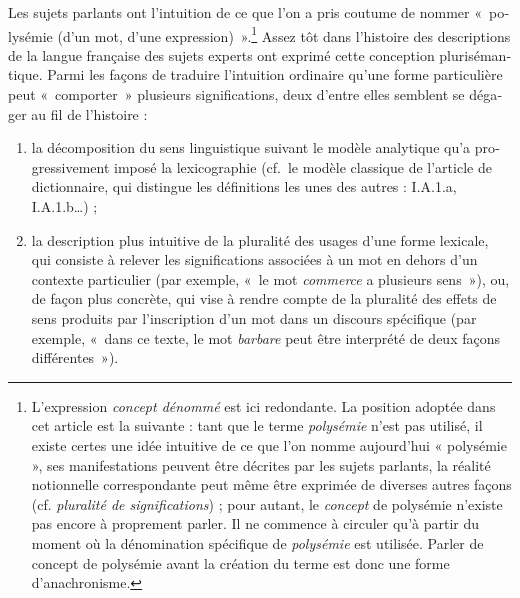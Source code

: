 \documentclass[french,output=paper,colorlinks,citecolor=brown]{../langscibook}
\begin{document}
\begin{otherlanguage}{french}
Les sujets parlants ont l’intuition de ce que l’on a pris coutume de nommer «~polysémie (d’un mot, d’une expression)~».\footnote{L’expression \emph{concept dénommé} est ici redondante. La position adoptée dans cet article est la suivante : tant que le terme \emph{polysémie} n’est pas utilisé, il existe certes une idée intuitive de ce que l’on nomme aujourd’hui « polysémie », ses manifestations peuvent être décrites par les sujets parlants, la réalité notionnelle correspondante peut même être exprimée de diverses autres façons (cf. \emph{pluralité de significations}) ; pour autant, le \emph{concept} de polysémie n’existe pas encore à proprement parler. Il ne commence à circuler qu’à partir du moment où la dénomination spécifique de \emph{polysémie} est utilisée. Parler de concept de polysémie avant la création du terme est donc une forme d’anachronisme.} Assez tôt dans l’histoire des descriptions de la langue française des sujets experts ont exprimé cette conception plurisémantique. Parmi les façons de traduire l’intuition ordinaire qu’une forme particulière peut «~comporter~» plusieurs significations, deux d’entre elles semblent se dégager au fil de l’histoire :

\begin{enumerate}
\item la décomposition du sens linguistique suivant le modèle analytique qu’a progressivement imposé la lexicographie (cf.~le modèle classique de l’article de dictionnaire, qui distingue les définitions les unes des autres : I.A.1.a, I.A.1.b…) ;

\item la description plus intuitive de la pluralité des usages d’une forme lexicale, qui consiste à relever les significations associées à un mot en dehors d’un contexte particulier (par exemple, «~le mot \textit{commerce} a plusieurs sens~»), ou, de façon plus concrète, qui vise à rendre compte de la pluralité des effets de sens produits par l’inscription d’un mot dans un discours spécifique (par exemple, «~dans ce texte, le mot \textit{barbare} peut être interprété de deux façons différentes~»).
\end{enumerate}


\end{otherlanguage}
\end{document}
